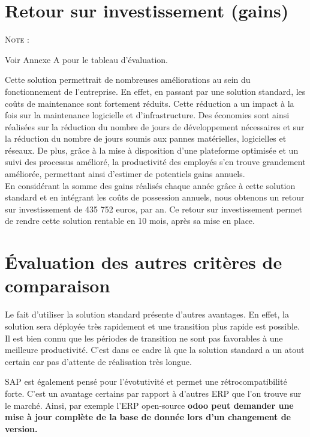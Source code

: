 \section{Retour sur investissement (gains)}

\begin{shaded}
\noindent\textsc{Note :} 

Voir Annexe A pour le tableau d'évaluation.
\end{shaded}

Cette solution permettrait de nombreuses améliorations au sein du fonctionnement de l’entreprise. En effet, en passant par une solution standard, les coûts de maintenance sont fortement réduits. Cette réduction a un impact à la fois sur la maintenance logicielle et d’infrastructure. Des économies sont ainsi réalisées sur la réduction du nombre de jours de développement nécessaires et sur la réduction du nombre de jours soumis aux pannes matérielles, logicielles et réseaux. De plus, grâce à la mise à disposition d’une plateforme optimisée et un suivi des processus amélioré, la productivité des employés s’en trouve grandement améliorée, permettant ainsi d’estimer de potentiels gains annuels. \\

En considérant la somme des gains réalisés chaque année grâce à cette solution standard et en intégrant les coûts de possession annuels, nous obtenons un retour sur investissement de 435 752 euros, par an. Ce retour sur investissement permet de rendre cette solution rentable en 10 mois, après sa mise en place.

\section{Évaluation des autres critères de comparaison}

Le fait d’utiliser la solution standard présente d’autres avantages. En effet, la solution sera déployée très rapidement et une transition plus rapide est possible. Il est bien connu que les périodes de transition ne sont pas favorables à une meilleure productivité. C’est dans ce cadre là que la solution standard a un atout certain car pas d’attente de réalisation très longue.

SAP est également pensé pour l’évotutivité et permet une rétrocompatibilité forte. C’est un avantage certains par rapport à d’autres ERP que l’on trouve sur le marché. Ainsi, par exemple l’ERP open-source \bf{odoo} peut demander une mise à jour complète de la base de donnée lors d’un changement de version.

